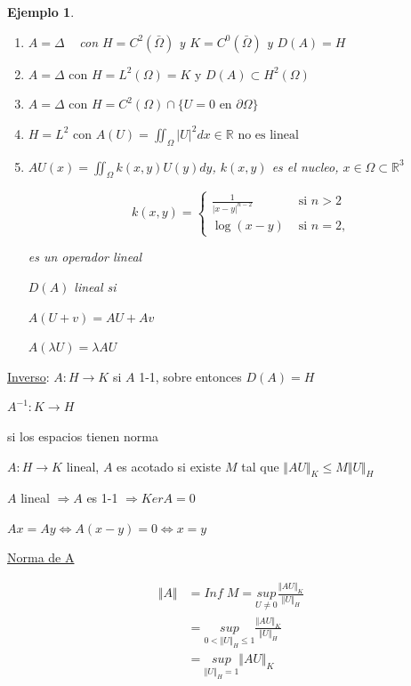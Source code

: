 \documentclass[a4paper,10pt]{book}
\newtheorem{ejemplo}{Ejemplo}
\begin{document}
\begin{ejemplo}
    \begin{enumerate}
        \item $A=\Delta\;\;\;$ con $H= C^2(\bar{\Omega} )$ y $K= C^0(\bar{\Omega})$ y $D(A)=H$  
        \item $A=\Delta \text{  con } H= L^2 (\Omega)  = K \text{ y }  D(A)\subset H^2(\Omega) $
        \item $A=\Delta \text{ con  } H= C^2(\Omega) \cap \{ U=0 \text{ en } \partial\Omega\}$
        \item $H= L^2 \text{ con } A(U) = \iint_{\Omega} |U|^2 dx \in \mathbb{R} \text{ no es lineal} $ 
        \item $A U(x) = \iint_\Omega k(x,y) U(y) dy $,  $k(x,y)$ es el nucleo, $x\in \Omega\subset \mathbb{R}^3$

    \[
    k(x,y)  = \left\{\begin{aligned}
        \frac{1}{|x-y|^{n-2}}  & \text{ si } n> 2 \\
         \log(x-y ) & \text{ si } n = 2,
       \end{aligned}
    \right.
    \]

    es un operador lineal 

    $D(A)$  lineal si
    
    $A(U+v) = A U  + A v$
    
    $A(\lambda U ) = \lambda A U $
    
    
     \end{enumerate}
\end{ejemplo}

\underline{Inverso}: $A: H \rightarrow K$ si  $A$ 1-1, sobre entonces $D(A)=H$ 

$A^{-1}:K\rightarrow H$


si los espacios tienen norma

$A:H \rightarrow K$ lineal, $A$ es acotado si existe $M$ tal que $\Vert AU\Vert_K \leq M\Vert U\Vert_H$

$A$ lineal $\Rightarrow A $ es 1-1 $\Rightarrow Ker A= 0$ 

$Ax = Ay \Leftrightarrow A(x-y) =0 \Leftrightarrow x=y $

\underline{Norma de A} 

\[
\begin{array}{ll}
\Vert A\Vert      &  = Inf\; M= \underset{U\neq 0}{sup} \frac{\Vert A U\Vert_{K}}{\Vert U\Vert_H} \\
     & = \underset{0<\Vert U\Vert_H\leq1 }{ sup} \frac{\Vert A U\Vert_{K}}{\Vert U\Vert_H} \\
     & = \underset{\Vert U\Vert_H = 1 }{ sup} \Vert A U\Vert_K
\end{array}
\]
\end{document}
